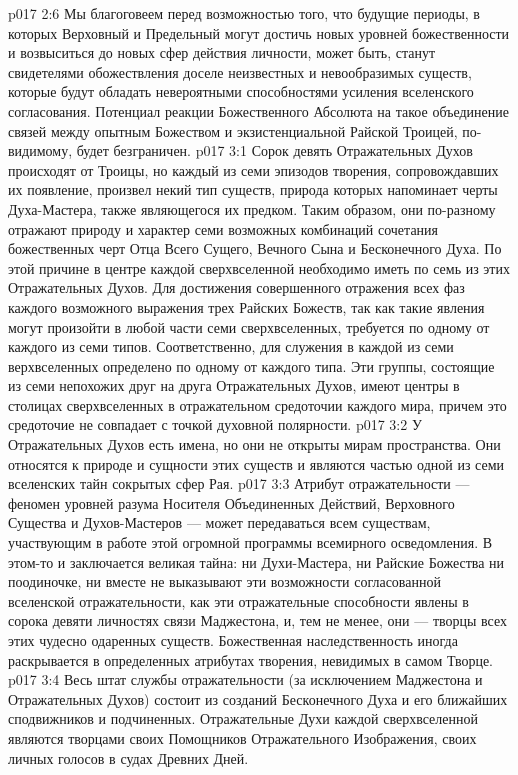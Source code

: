 \vs p017 2:6 Мы благоговеем перед возможностью того, что будущие периоды, в которых Верховный и Предельный могут достичь новых уровней божественности и возвыситься до новых сфер действия личности, может быть, станут свидетелями обожествления доселе неизвестных и невообразимых существ, которые будут обладать невероятными способностями усиления вселенского согласования. Потенциал реакции Божественного Абсолюта на такое объединение связей между опытным Божеством и экзистенциальной Райской Троицей, по\hyp{}видимому, будет безграничен.
\vs p017 3:1 Сорок девять Отражательных Духов происходят от Троицы, но каждый из семи эпизодов творения, сопровождавших их появление, произвел некий тип существ, природа которых напоминает черты Духа\hyp{}Мастера, также являющегося их предком. Таким образом, они по\hyp{}разному отражают природу и характер семи возможных комбинаций сочетания божественных черт Отца Всего Сущего, Вечного Сына и Бесконечного Духа. По этой причине в центре каждой сверхвселенной необходимо иметь по семь из этих Отражательных Духов. Для достижения совершенного отражения всех фаз каждого возможного выражения трех Райских Божеств, так как такие явления могут произойти в любой части семи сверхвселенных, требуется по одному от каждого из семи типов. Соответственно, для служения в каждой из семи верхвселенных определено по одному от каждого типа. Эти группы, состоящие из семи непохожих друг на друга Отражательных Духов, имеют центры в столицах сверхвселенных в отражательном средоточии каждого мира, причем это средоточие не совпадает с точкой духовной полярности.
\vs p017 3:2 У Отражательных Духов есть имена, но они не открыты мирам пространства. Они относятся к природе и сущности этих существ и являются частью одной из семи вселенских тайн сокрытых сфер Рая.
\vs p017 3:3 Атрибут отражательности --- феномен уровней разума Носителя Объединенных Действий, Верховного Существа и Духов\hyp{}Мастеров --- может передаваться всем существам, участвующим в работе этой огромной программы всемирного осведомления. В этом\hyp{}то и заключается великая тайна: ни Духи\hyp{}Мастера, ни Райские Божества ни поодиночке, ни вместе не выказывают эти возможности согласованной вселенской отражательности, как эти отражательные способности явлены в сорока девяти личностях связи Маджестона, и, тем не менее, они --- творцы всех этих чудесно одаренных существ. Божественная наследственность иногда раскрывается в определенных атрибутах творения, невидимых в самом Творце.
\vs p017 3:4 Весь штат службы отражательности (за исключением Маджестона и Отражательных Духов) состоит из созданий Бесконечного Духа и его ближайших сподвижников и подчиненных. Отражательные Духи каждой сверхвселенной являются творцами своих Помощников Отражательного Изображения, своих личных голосов в судах Древних Дней.
